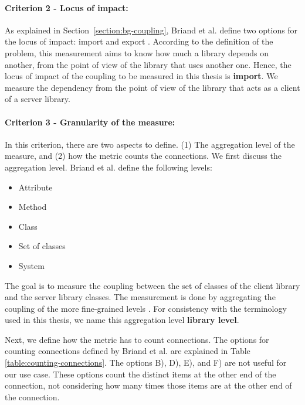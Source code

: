 \paragraph{Criterion 2 - Locus of impact:}
As explained in Section~\ref{section:bg-coupling}, Briand et al. define two options for the locus of impact: import and export \cite{briand1999unified}. According to the definition of the problem, this measurement aims to know how much a library depends on another, from the point of view of the library that uses another one. Hence, the locus of impact of the coupling to be measured in this thesis is \textbf{import}. We measure the dependency from the point of view of the library that acts as a client of a server library.

\paragraph{Criterion 3 - Granularity of the measure:}
In this criterion, there are two aspects to define. (1) The aggregation level of the measure, and (2) how the metric counts the connections. We first discuss the aggregation level. Briand et al. \cite{briand1999unified} define the following levels:

\begin{itemize}[noitemsep]
  \renewcommand\labelitemi{--}
  \item Attribute
  \item Method
  \item Class
  \item Set of classes
  \item System
\end{itemize}

\blankls
The goal is to measure the coupling between the set of classes of the client library and the server library classes. The measurement is done by aggregating the coupling of the more fine-grained levels \cite{briand1999unified}. For consistency with the terminology used in this thesis, we name this aggregation level \textbf{library level}.

Next, we define how the metric has to count connections. The options for counting connections defined by Briand et al. \cite{briand1999unified} are explained in Table \ref{table:counting-connections}. The options B), D), E), and F) are not useful for our use case. These options count the distinct items at the other end of the connection, not considering how many times those items are at the other end of the connection.

